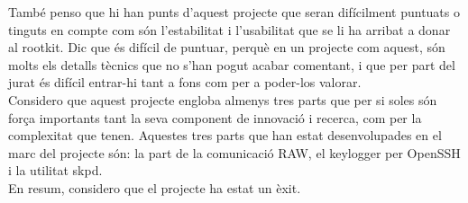 També penso que hi han punts d'aquest projecte que seran difícilment puntuats o tinguts en compte com 
són l'estabilitat i l'usabilitat que se li ha arribat a donar al rootkit. Dic que és difícil de puntuar, 
perquè en un projecte com aquest, són molts els detalls tècnics que no s'han pogut acabar comentant, i
que per part del jurat és difícil entrar-hi tant a fons com per a poder-los valorar. \\

Considero que aquest projecte engloba almenys tres parts que per si soles són força importants
tant la seva component de innovació i recerca, com per la complexitat que
tenen. Aquestes tres parts que han estat desenvolupades en el marc del projecte són: la part de la 
comunicació RAW, el keylogger per OpenSSH i la utilitat skpd. \\

En resum, considero que el projecte ha estat un èxit.

